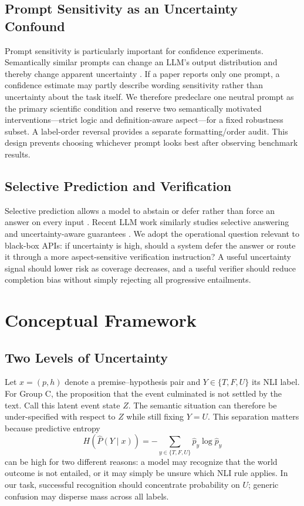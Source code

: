 \documentclass[letterpaper]{article}
\begin{document}
\subsection{Prompt Sensitivity as an Uncertainty Confound}
Prompt sensitivity is particularly important for confidence experiments. Semantically similar prompts can change an LLM's output distribution and thereby change apparent uncertainty \citep{cox-etal-2025-mapping}. If a paper reports only one prompt, a confidence estimate may partly describe wording sensitivity rather than uncertainty about the task itself. We therefore predeclare one neutral prompt as the primary scientific condition and reserve two semantically motivated interventions---strict logic and definition-aware aspect---for a fixed robustness subset. A label-order reversal provides a separate formatting/order audit. This design prevents choosing whichever prompt looks best after observing benchmark results.

\subsection{Selective Prediction and Verification}
Selective prediction allows a model to abstain or defer rather than force an answer on every input \citep{geifman-el-yaniv-2019-selectivenet}. Recent LLM work similarly studies selective answering and uncertainty-aware guarantees \citep{cole-etal-2023-ambiguous,wang-etal-2025-sconu}. We adopt the operational question relevant to black-box APIs: if uncertainty is high, should a system defer the answer or route it through a more aspect-sensitive verification instruction? A useful uncertainty signal should lower risk as coverage decreases, and a useful verifier should reduce completion bias without simply rejecting all progressive entailments.

\section{Conceptual Framework}
\subsection{Two Levels of Uncertainty}
Let $x=(p,h)$ denote a premise--hypothesis pair and $Y\in\{T,F,U\}$ its NLI label. For Group C, the proposition that the event culminated is not settled by the text. Call this latent event state $Z$. The semantic situation can therefore be under-specified with respect to $Z$ while still fixing $Y=U$. This separation matters because predictive entropy
\begin{equation}
H(\hat{P}(Y\mid x))=-\sum_{y\in\{T,F,U\}}\hat{p}_y\log \hat{p}_y
\end{equation}
can be high for two different reasons: a model may recognize that the world outcome is not entailed, or it may simply be unsure which NLI rule applies. In our task, successful recognition should concentrate probability on $U$; generic confusion may disperse mass across all labels.
\end{document}
